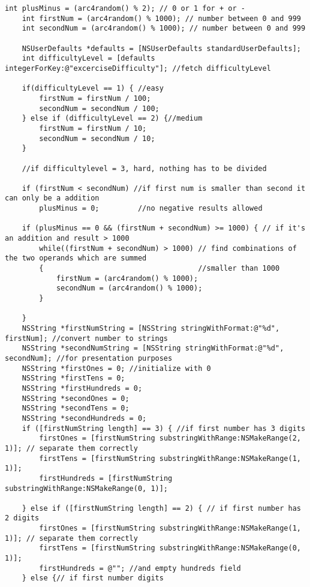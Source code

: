 \begin{lstlisting}[caption=Generierung von Rechenaufgaben im Übungsmodus, label=listing:problemGeneration]
    int plusMinus = (arc4random() % 2); // 0 or 1 for + or -
    int firstNum = (arc4random() % 1000); // number between 0 and 999
    int secondNum = (arc4random() % 1000); // number between 0 and 999
    
    NSUserDefaults *defaults = [NSUserDefaults standardUserDefaults];
    int difficultyLevel = [defaults integerForKey:@"excerciseDifficulty"]; //fetch difficultyLevel
    
    if(difficultyLevel == 1) { //easy
        firstNum = firstNum / 100;  
        secondNum = secondNum / 100;
    } else if (difficultyLevel == 2) {//medium
        firstNum = firstNum / 10;
        secondNum = secondNum / 10;
    }
    
    //if difficultylevel = 3, hard, nothing has to be divided
    
    if (firstNum < secondNum) //if first num is smaller than second it can only be a addition
        plusMinus = 0;         //no negative results allowed
    
    if (plusMinus == 0 && (firstNum + secondNum) >= 1000) { // if it's an addition and result > 1000
        while((firstNum + secondNum) > 1000) // find combinations of the two operands which are summed
        {                                    //smaller than 1000
            firstNum = (arc4random() % 1000);
            secondNum = (arc4random() % 1000);
        }
        
    }
    NSString *firstNumString = [NSString stringWithFormat:@"%d", firstNum]; //convert number to strings
    NSString *secondNumString = [NSString stringWithFormat:@"%d", secondNum]; //for presentation purposes
    NSString *firstOnes = 0; //initialize with 0
    NSString *firstTens = 0;
    NSString *firstHundreds = 0;
    NSString *secondOnes = 0;
    NSString *secondTens = 0;
    NSString *secondHundreds = 0;
    if ([firstNumString length] == 3) { //if first number has 3 digits
        firstOnes = [firstNumString substringWithRange:NSMakeRange(2, 1)]; // separate them correctly
        firstTens = [firstNumString substringWithRange:NSMakeRange(1, 1)];
        firstHundreds = [firstNumString substringWithRange:NSMakeRange(0, 1)];
        
    } else if ([firstNumString length] == 2) { // if first number has 2 digits
        firstOnes = [firstNumString substringWithRange:NSMakeRange(1, 1)]; // separate them correctly
        firstTens = [firstNumString substringWithRange:NSMakeRange(0, 1)];
        firstHundreds = @""; //and empty hundreds field
    } else {// if first number digits
        

\end{lstlisting}
